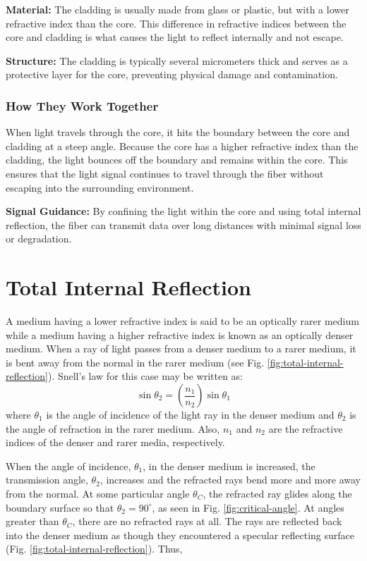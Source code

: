 \documentclass{article}
\theoremstyle{mytheoremstyle}
\theoremstyle{mytheoremstyle}
\theoremstyle{myproblemstyle}
\begin{document}
\textbf{Material:} The cladding is usually made from glass or plastic, but with a lower refractive index than the core. This difference in refractive indices between the core and cladding is what causes the light to reflect internally and not escape.

\textbf{Structure:} The cladding is typically several micrometers thick and serves as a protective layer for the core, preventing physical damage and contamination.

\subsubsection{How They Work Together}

When light travels through the core, it hits the boundary between the core and cladding at a steep angle. Because the core has a higher refractive index than the cladding, the light bounces off the boundary and remains within the core. This ensures that the light signal continues to travel through the fiber without escaping into the surrounding environment.

\textbf{Signal Guidance:} By confining the light within the core and using total internal reflection, the fiber can transmit data over long distances with minimal signal loss or degradation.

\section{Total Internal Reflection}

A medium having a lower refractive index is said to be an optically rarer medium while a medium having a higher refractive index is known as an optically denser medium. When a ray of light passes from a denser medium to a rarer medium, it is bent away from the normal in the rarer medium (see Fig. \ref{fig:total-internal-reflection}). Snell's law for this case may be written as:
\[
\sin \theta_2 = \left(\frac{n_1}{n_2}\right) \sin \theta_1
\]
where \(\theta_1\) is the angle of incidence of the light ray in the denser medium and \(\theta_2\) is the angle of refraction in the rarer medium. Also, \(n_1\) and \(n_2\) are the refractive indices of the denser and rarer media, respectively.

When the angle of incidence, \(\theta_1\), in the denser medium is increased, the transmission angle, \(\theta_2\), increases and the refracted rays bend more and more away from the normal. At some particular angle \(\theta_C\), the refracted ray glides along the boundary surface so that \(\theta_2 = 90^\circ\), as seen in Fig. \ref{fig:critical-angle}. At angles greater than \(\theta_C\), there are no refracted rays at all. The rays are reflected back into the denser medium as though they encountered a specular reflecting surface (Fig. \ref{fig:total-internal-reflection}). Thus,
\end{document}
